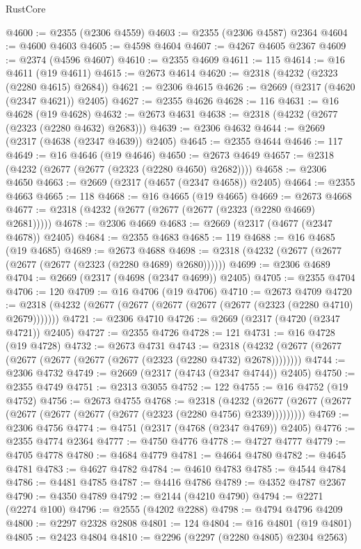 \begin{lexlean}{RustCore}
\begin{coremodule}
@4600 := @2355 (@2306 @4559)
@4603 := @2355 (@2306 @4587) @2364
@4604 := @4600 @4603
@4605 := @4598 @4604
@4607 := @4267 @4605 @2367
@4609 := @2374 (@4596 @4607)
@4610 := @2355 @4609
@4611 := 115
@4614 := @16 @4611 (@19 @4611)
@4615 := @2673 @4614
@4620 := @2318 (@4232 (@2323 (@2280 @4615) @2684))
@4621 := @2306 @4615
@4626 := @2669 (@2317 (@4620 (@2347 @4621)) @2405)
@4627 := @2355 @4626
@4628 := 116
@4631 := @16 @4628 (@19 @4628)
@4632 := @2673 @4631
@4638 := @2318 (@4232 (@2677 (@2323 (@2280 @4632) @2683)))
@4639 := @2306 @4632
@4644 := @2669 (@2317 (@4638 (@2347 @4639)) @2405)
@4645 := @2355 @4644
@4646 := 117
@4649 := @16 @4646 (@19 @4646)
@4650 := @2673 @4649
@4657 := @2318 (@4232 (@2677 (@2677 (@2323 (@2280 @4650) @2682))))
@4658 := @2306 @4650
@4663 := @2669 (@2317 (@4657 (@2347 @4658)) @2405)
@4664 := @2355 @4663
@4665 := 118
@4668 := @16 @4665 (@19 @4665)
@4669 := @2673 @4668
@4677 := @2318 (@4232 (@2677 (@2677 (@2677 (@2323 (@2280 @4669) @2681)))))
@4678 := @2306 @4669
@4683 := @2669 (@2317 (@4677 (@2347 @4678)) @2405)
@4684 := @2355 @4683
@4685 := 119
@4688 := @16 @4685 (@19 @4685)
@4689 := @2673 @4688
@4698 := @2318 (@4232 (@2677 (@2677 (@2677 (@2677 (@2323 (@2280 @4689) @2680))))))
@4699 := @2306 @4689
@4704 := @2669 (@2317 (@4698 (@2347 @4699)) @2405)
@4705 := @2355 @4704
@4706 := 120
@4709 := @16 @4706 (@19 @4706)
@4710 := @2673 @4709
@4720 := @2318 (@4232 (@2677 (@2677 (@2677 (@2677 (@2677 (@2323 (@2280 @4710) @2679)))))))
@4721 := @2306 @4710
@4726 := @2669 (@2317 (@4720 (@2347 @4721)) @2405)
@4727 := @2355 @4726
@4728 := 121
@4731 := @16 @4728 (@19 @4728)
@4732 := @2673 @4731
@4743 := @2318 (@4232 (@2677 (@2677 (@2677 (@2677 (@2677 (@2677 (@2323 (@2280 @4732) @2678))))))))
@4744 := @2306 @4732
@4749 := @2669 (@2317 (@4743 (@2347 @4744)) @2405)
@4750 := @2355 @4749
@4751 := @2313 @3055
@4752 := 122
@4755 := @16 @4752 (@19 @4752)
@4756 := @2673 @4755
@4768 := @2318
    (@4232 (@2677 (@2677 (@2677 (@2677 (@2677 (@2677 (@2677 (@2323 (@2280 @4756) @2339)))))))))
@4769 := @2306 @4756
@4774 := @4751 (@2317 (@4768 (@2347 @4769)) @2405)
@4776 := @2355 @4774 @2364
@4777 := @4750 @4776
@4778 := @4727 @4777
@4779 := @4705 @4778
@4780 := @4684 @4779
@4781 := @4664 @4780
@4782 := @4645 @4781
@4783 := @4627 @4782
@4784 := @4610 @4783
@4785 := @4544 @4784
@4786 := @4481 @4785
@4787 := @4416 @4786
@4789 := @4352 @4787 @2367
@4790 := @4350 @4789
@4792 := @2144 (@4210 @4790)
@4794 := @2271 (@2274 @100)
@4796 := @2555 (@4202 @2288)
@4798 := @4794 @4796 @4209
@4800 := @2297 @2328 @2808
@4801 := 124
@4804 := @16 @4801 (@19 @4801)
@4805 := @2423 @4804
@4810 := @2296 (@2297 (@2280 @4805) @2304 @2563)

\end{coremodule}
\end{lexlean}
